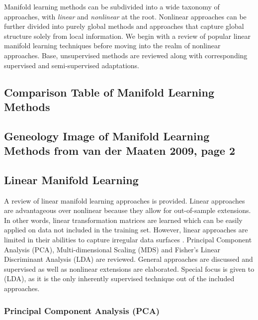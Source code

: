 Manifold learning methods can be subdivided into a wide taxonomy of approaches, with \textit{linear} and \textit{nonlinear} at the root. Nonlinear approaches can be further divided into purely global methods and approaches that capture global structure solely from local information.  We begin with a review of popular linear manifold learning techniques before moving into the realm of nonlinear approaches. Base, unsupervised methods are reviewed along with corresponding supervised and semi-supervised adaptations. 

\subsection{Comparison Table of Manifold Learning Methods}
\subsection{Geneology Image of Manifold Learning Methods from van der Maaten 2009, page  2}

\subsection{Linear Manifold Learning}
A review of linear manifold learning approaches is provided.  Linear approaches are advantageous over nonlinear because they allow for out-of-sample extensions.  In other words, linear transformation matrices are learned which can be easily applied on data not included in the training set.  However, linear approaches are limited in their abilities to capture irregular data surfaces \citep{Kegl2008PrincipalManifoldsTextbook}.  Principal Component Analysis (PCA), Multi-dimensional Scaling (MDS) and Fisher's Linear Discriminant Analysis (LDA) are reviewed.  General approaches are discussed and supervised as well as nonlinear extensions are elaborated. Special focus is given to (LDA), as it is the only inherently supervised technique out of the included approaches.

\subsubsection{Principal Component Analysis (PCA)} \label{sec:PCA}

